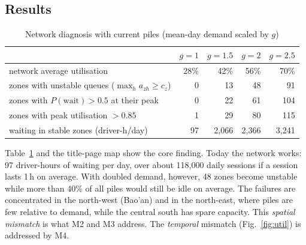 \documentclass[11pt,a4paper]{article}
\begin{document}
\subsection{Results}
\begin{table}[H]\centering\small
\caption{Network diagnosis with current piles (mean-day demand scaled by $g$)}\label{tab:m1}
\begin{tabular}{@{}lrrrr@{}}\toprule
 & $g=1$ & $g=1.5$ & $g=2$ & $g=2.5$\\\midrule
network average utilisation & 28\% & 42\% & 56\% & 70\%\\
zones with unstable queues ($\max_h a_{zh} \ge c_z$) & 0 & 13 & 48 & 91\\
zones with $P(\text{wait}) > 0.5$ at their peak & 0 & 22 & 61 & 104\\
zones with peak utilisation $> 0.85$ & 1 & 29 & 80 & 115\\
waiting in stable zones (driver-h/day) & 97 & 2{,}066 & 2{,}366 & 3{,}241\\\bottomrule
\end{tabular}
\end{table}
Table~\ref{tab:m1} and the title-page map show the core finding. Today the network works: 97 driver-hours of waiting per day, over about 118{,}000 daily sessions if a session lasts 1\,h on average. With doubled demand, however, 48 zones become unstable while more than 40\% of all piles would still be idle on average. The failures are concentrated in the north-west (Bao'an) and in the north-east, where piles are few relative to demand, while the central south has spare capacity. This \emph{spatial mismatch} is what M2 and M3 address. The \emph{temporal} mismatch (Fig.~\ref{fig:util}) is addressed by M4.
\end{document}
